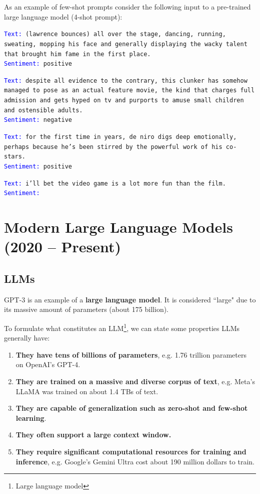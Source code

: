 As an example of few-shot prompts consider the following input to a pre-trained large language model (4-shot prompt):

\hrulefill

\texttt{\textcolor{blue}{Text:} (lawrence bounces) all over the stage, dancing, running, sweating, mopping his face and generally displaying the wacky talent that brought him fame in the first place.
\\
\textcolor{blue}{Sentiment:} positive}

\texttt{\textcolor{blue}{Text:} despite all evidence to the contrary, this clunker has somehow managed to pose as an actual feature movie, the kind that charges full admission and gets hyped on tv and purports to amuse small children and ostensible adults.\\
\textcolor{blue}{Sentiment:} negative
}

\texttt{\textcolor{blue}{Text:} for the first time in years, de niro digs deep emotionally, perhaps because he's been stirred by the powerful work of his co-stars.\\
\textcolor{blue}{Sentiment:} positive}

\texttt{\textcolor{blue}{Text:} i'll bet the video game is a lot more fun than the film. \\
\textcolor{blue}{Sentiment:}
}

\hrulefill

\section{Modern Large Language Models (2020 -- Present)}
\subsection{LLMs}
GPT-3 is an example of a \textbf{large language model}. It is considered ``large" due to its massive amount of parameters (about 175 billion).

To formulate what constitutes an LLM\footnote{Large language model}, we can state some properties LLMs generally have:
\begin{enumerate}
    \item \textbf{They have tens of billions of parameters}, e.g. 1.76 trillion parameters on OpenAI's GPT-4.
    \item \textbf{They are trained on a massive and diverse corpus of text}, e.g. Meta's LLaMA was trained on about 1.4 TBs of text.
    \item  \textbf{They are capable of generalization such as zero-shot and few-shot learning}.
    \item \textbf{They often support a large context window.}
    \item  \textbf{They require significant computational resources for training and inference}, e.g. Google's Gemini Ultra cost about 190 million dollars to train.
\end{enumerate}

